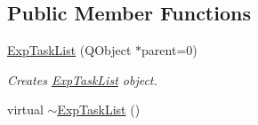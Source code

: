 \subsection*{Public Member Functions}
\begin{DoxyCompactItemize}
\item 
\hyperlink{class_exp_task_list_a8641c39dd170ede0b12a7f17997db03c}{Exp\+Task\+List} (Q\+Object $\ast$parent=0)
\begin{DoxyCompactList}\small\item\em Creates \hyperlink{class_exp_task_list}{Exp\+Task\+List} object. \end{DoxyCompactList}\item 
\hypertarget{class_exp_task_list_ad65ef5ef9a9826428de3ed56c577c40c}{}virtual \hyperlink{class_exp_task_list_ad65ef5ef9a9826428de3ed56c577c40c}{$\sim$\+Exp\+Task\+List} ()\label{class_exp_task_list_ad65ef5ef9a9826428de3ed56c577c40c}


\end{DoxyCompactItemize}
